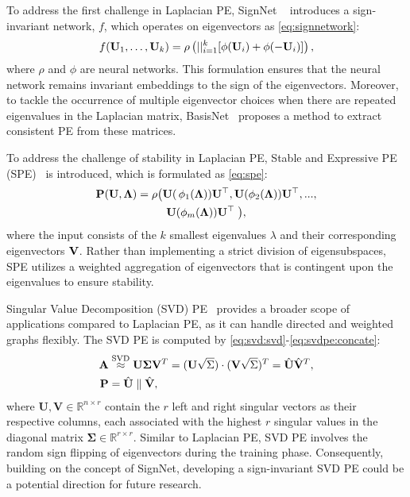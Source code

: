To address the first challenge in Laplacian PE, SignNet ~\cite{lim2023sign} introduces a sign-invariant network, $f$, which operates on eigenvectors as  \cref{eq:signnetwork}:
\begin{equation}
    f(\mathbf{U}_1, \ldots, \mathbf{U}_k) = \rho\left(||_{i=1}^k[\phi(\mathbf{U}_i) + \phi(-\mathbf{U}_i)] \right), \label{eq:signnetwork}
\end{equation}
where $\rho$ and $\phi$ are neural networks. This formulation ensures that the neural network remains invariant embeddings to the sign of the eigenvectors. 
Moreover, to tackle the occurrence of multiple eigenvector choices when there are repeated eigenvalues in the Laplacian matrix, BasisNet~\cite{lim2023sign} proposes a method to extract consistent PE from these matrices.


To address the challenge of stability in Laplacian PE, Stable and Expressive PE (SPE)~\cite{huang2024on} is introduced,
which is formulated as \cref{eq:spe}: 
\begin{multline}
    \mathbf{P}(\mathbf{U},\mathbf{\Lambda})= \rho\big(\mathbf{U}(\,\phi_1(\mathbf{\Lambda}))\mathbf{U}^{\top}, \mathbf{U}(\phi_2(\mathbf{\Lambda}))\mathbf{U}^{\top}, ..., \\  \mathbf{U}(\phi_m(\mathbf{\Lambda}))\mathbf{U}^{\top}\;\big),
    \label{eq:spe}
\end{multline}
where the input consists of the $k$ smallest eigenvalues $\lambda$ and their corresponding eigenvectors $\mathbf{V}$. Rather than implementing a strict division of eigensubspaces, SPE utilizes a weighted aggregation of eigenvectors that is contingent upon the eigenvalues to ensure stability.

Singular Value Decomposition (SVD) PE~\cite{hussain2022global} provides a broader  scope of applications compared to Laplacian PE, %
as it can handle directed and weighted graphs flexibly. 
The SVD PE is computed by \cref{eq:svd:svd}-\eqref{eq:svdpe:concate}:
\begin{align}
  \mathbf{A} &\stackrel{\mathrm{SVD}}{\approx}
  \mathbf{U}\mathbf{\Sigma}\mathbf{V}^T 
  = (\mathbf{U}\sqrt{\Sigma}) \cdot (\mathbf{V}\sqrt{\Sigma})^T
  = \hat{\mathbf{U}}\hat{\mathbf{V}}^T, \label{eq:svd:svd}\\
  \mathbf{P} &= \hat{\mathbf{U}} \parallel \hat{\mathbf{V}},
   \label{eq:svdpe:concate}
\end{align}
where $\mathbf{U,V}\in \mathbb{R}^{n\times r}$ contain the $r$ left and right singular vectors as their respective columns, each associated with the highest $r$ singular values in the diagonal matrix $\mathbf{\Sigma} \in \mathbb{R}^{r \times r}$. Similar to  Laplacian PE, SVD PE involves the random sign flipping of eigenvectors during the training phase. Consequently, building on the concept of  SignNet, developing a sign-invariant SVD PE could be a potential direction for future research.

